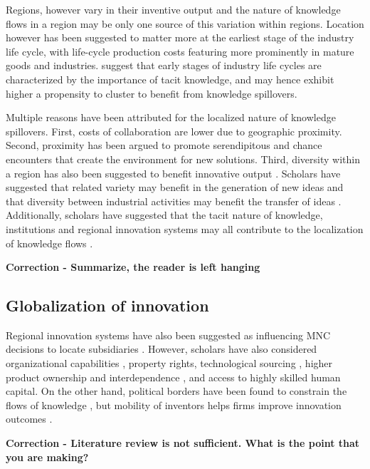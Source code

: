 \documentclass[12pt,letterpaper]{article}
\begin{document}
Regions, however vary in their inventive output \citep*{Agrawal2014b} and the nature of knowledge flows in a region may be only one source of this variation within regions. Location however has been suggested to matter more at the earliest stage of the industry life cycle, with life-cycle production costs featuring more prominently in mature goods and industries. \cite{Audretsch1996b} suggest that early stages of  industry life cycles are characterized by the importance of tacit knowledge, and may hence exhibit higher a propensity to cluster to benefit from knowledge spillovers. \par

Multiple reasons have been attributed for the localized nature of knowledge spillovers. First, costs of collaboration are lower due to geographic proximity. Second, proximity has been argued to promote serendipitous and chance encounters that create the environment for new solutions. Third, diversity within a region has also been suggested to benefit innovative output \citep{Feldman1999}. Scholars have suggested that related variety \citep*{Boschma2009, Frenken2007} may benefit in the generation of new ideas and that diversity between industrial activities may benefit the transfer of ideas \citep{Jacobs1969}. Additionally, scholars have suggested that the tacit nature of knowledge, institutions and regional innovation systems may all contribute to the localization of knowledge flows  \citep{Cooke1996, Maskell1999, Howells1996, Howells2002}.

\textbf{Correction - Summarize, the reader is left hanging}
\subsection{Globalization of innovation}
Regional innovation systems have also been suggested as influencing MNC decisions to locate subsidiaries \citep{Andersen2005}. However, scholars have also considered organizational capabilities \citep{Zhao2006}, property rights, technological sourcing \citep{Florida1997}, higher product ownership and interdependence \citep{Pearce1999}, and access to highly skilled human capital. On the other hand, political borders have been found to constrain the flows of knowledge \citep{Singh2013}, but mobility of inventors helps firms improve innovation outcomes \citep*{Alnuaimi2012b}.

\textbf{Correction - Literature review is not sufficient. What is the point that you are making?}
\end{document}
